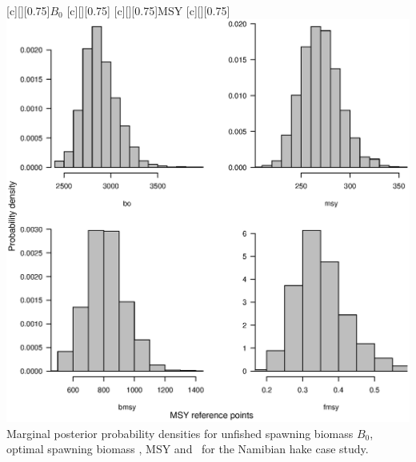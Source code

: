 \begin{multicols}{2}
\begin{figurehere}
	\centering
	[][0.75]{$B_0$}
	[][0.75]{\bmsy}
	[][0.75]{MSY}
	[][0.75]{\fmsy}
	\includegraphics[width=\columnwidth]{iscamFigs/fig6.eps}\\
	\caption{Marginal posterior probability densities for unfished spawning biomass $B_0$, optimal spawning biomass \bmsy, MSY and \fmsy\ for the Namibian hake case study.}\label{fig6}
\end{figurehere}


\end{multicols}
